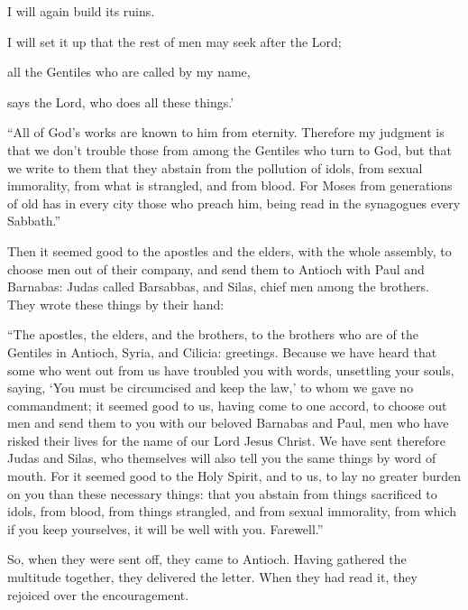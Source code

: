 {\par }{\Q I will again build its ruins.
\par }{\Q I will set it up
that the rest of men may seek after the Lord;
\par }{\Q all the Gentiles who are called by my name,
\par }{\Q says the Lord, who does all these things.’
\par }{\PP {}“All of God’s works are known to him from eternity.
Therefore my judgment is that we don’t trouble those from among the Gentiles who turn to God,
but that we write to them that they abstain from the pollution of idols, from sexual immorality, from what is strangled, and from blood.
For Moses from generations of old has in every city those who preach him, being read in the synagogues every Sabbath.”
\par }{\PP {}Then it seemed good to the apostles and the elders, with the whole assembly, to choose men out of their company, and send them to Antioch with Paul and Barnabas: Judas called Barsabbas, and Silas, chief men among the brothers.
They wrote these things by their hand:
\par }{\PP “The apostles, the elders, and the brothers, to the brothers who are of the Gentiles in Antioch, Syria, and Cilicia: greetings.
Because we have heard that some who went out from us have troubled you with words, unsettling your souls, saying, ‘You must be circumcised and keep the law,’ to whom we gave no commandment;
it seemed good to us, having come to one accord, to choose out men and send them to you with our beloved Barnabas and Paul,
men who have risked their lives for the name of our Lord Jesus Christ.
We have sent therefore Judas and Silas, who themselves will also tell you the same things by word of mouth.
For it seemed good to the Holy Spirit, and to us, to lay no greater burden on you than these necessary things:
that you abstain from things sacrificed to idols, from blood, from things strangled, and from sexual immorality, from which if you keep yourselves, it will be well with you. Farewell.”
\par }{\PP {}So, when they were sent off, they came to Antioch. Having gathered the multitude together, they delivered the letter.
When they had read it, they rejoiced over the encouragement.
}
